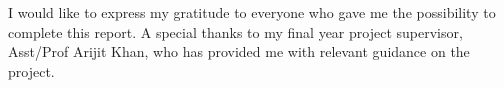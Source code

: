 
\begin{acknowledgements}      

I would like to express my gratitude to everyone who gave me the possibility to complete this report. A special thanks to my final year project supervisor, Asst/Prof Arijit Khan, who has provided me with relevant guidance on the project.

\end{acknowledgements}
